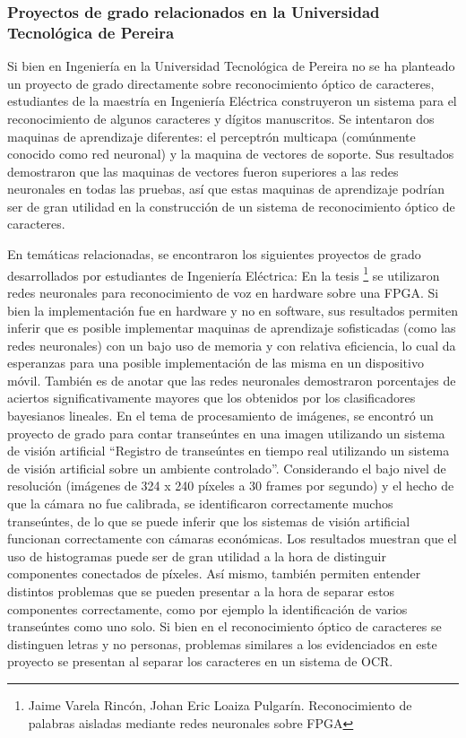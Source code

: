 \documentclass[a4paper, 11pt, oneside]{article}
\begin{document}
	\subsubsection{Proyectos de grado relacionados en la Universidad Tecnológica de Pereira}
	Si bien en Ingeniería en la Universidad Tecnológica de Pereira no se ha planteado un proyecto 
    de grado directamente sobre reconocimiento óptico de caracteres, estudiantes de la maestría en
    Ingeniería Eléctrica construyeron un sistema para el reconocimiento de algunos caracteres 
    y dígitos manuscritos. Se intentaron dos maquinas de aprendizaje diferentes:
	el perceptrón multicapa (comúnmente conocido como red neuronal) y la maquina de vectores de
	soporte. Sus resultados demostraron que las maquinas de vectores fueron superiores a las redes
    neuronales en todas las pruebas, así que estas maquinas de aprendizaje podrían ser de gran 
    utilidad en la construcción de un sistema de reconocimiento óptico de caracteres.\newline
    
	En temáticas relacionadas, se encontraron los siguientes proyectos de grado desarrollados por 
    estudiantes de Ingeniería Eléctrica:    
    En la tesis \footnote{Jaime Varela Rincón, Johan Eric Loaiza Pulgarín. Reconocimiento de palabras
    aisladas mediante redes neuronales sobre FPGA} se utilizaron redes neuronales para reconocimiento
    de voz en hardware sobre una FPGA. 
    Si bien la implementación fue en hardware y no en software, sus resultados permiten inferir que es 
    posible implementar maquinas de aprendizaje sofisticadas (como las redes neuronales) con un bajo uso
    de memoria y con relativa eficiencia, lo cual da esperanzas para una posible implementación de las 
    misma en un dispositivo móvil. También es de anotar que las redes neuronales demostraron porcentajes 
    de aciertos significativamente mayores que los obtenidos por los clasificadores bayesianos lineales.
	\newline \newline
	En el tema de procesamiento de imágenes, se encontró un proyecto de grado para contar transeúntes en
    una imagen utilizando un sistema de visión artificial ``Registro de transeúntes en tiempo real utilizando
    un sistema de visión artificial sobre un ambiente controlado''. Considerando el bajo nivel de
	resolución (imágenes de 324 x 240 píxeles a 30 frames por segundo) y el hecho de que la cámara no
	fue calibrada, se identificaron correctamente muchos transeúntes, de lo que se puede inferir que los 
    sistemas de visión artificial funcionan correctamente con cámaras económicas. Los resultados muestran que
	el uso de histogramas puede ser de gran utilidad a la hora de distinguir componentes conectados de 
    píxeles. Así mismo, también permiten entender distintos problemas que se pueden presentar a la hora de
    separar estos componentes correctamente, como por ejemplo la identificación de varios transeúntes como 
    uno solo. Si bien en el reconocimiento óptico de caracteres se distinguen letras y no personas, problemas 
    similares a los evidenciados en este proyecto se presentan al separar los caracteres en un sistema de 
	OCR.\newline
	
\end{document}
